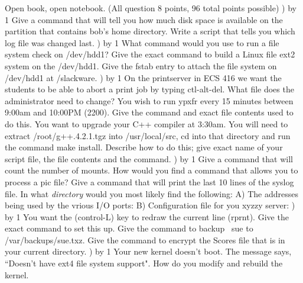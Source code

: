 
\parindent=0in
\nopagenumbers
\newcount\quesno
{}
\def\ques{\number\quesno) \advance\quesno by 1}
\def\aspace{\vskip 1.5in}

Open book, open notebook. (All question 8 points, 96 total points possible)
\hfill\break
\ques
Give a command that will tell you how much disk space is available on
the partition that contains bob's home directory.
\vskip 0.4in
Write a script that tells you which log file was changed last.
\vskip 1.1in
\ques
What command would you use to run a file system check on
{\ltt{}/dev/hdd1}?
\vskip 0.4in
Give the exact command to build a Linux file ext2 system on the
{\ltt{}/dev/hdd1}.
\vskip 0.4in
Give the {\ltt{}fstab} entry to attach the file system
on {\ltt{}/dev/hdd1} at {\ltt{}/slackware}.
\vskip 0.4in
\ques
On the printserver in ECS 416 we want the students to be able to
abort a print job by typing {\ltt{}ctl-alt-del}.
What file does the administrator need to change?
\vskip 0.4in
You wish to run {\ltt{}ypxfr} every 15 minutes between 9:00am and
10:00PM (2200).
Give the command and exact file contents used to do this.
\vskip 1.4in
You want to upgrade your {\ltt{}C++} compiler at 3:30am.
You will need to extract {\ltt{}/root/g++.4.2.1.tgz} into
{\ltt{}/usr/local/src}, {\ltt{}cd} into that directory and
run the command {\ltt{}make install}.
Describe how to do this; give exact name of your script file, the file contents
and the command.
\vskip 1.7in
\vfill\eject
\ques
Give a command that will count the number of mounts.
\vskip 0.4in
How would you find a command that allows you to process a {\ltt{}pic} file?
\vskip 0.4in
Give a command that will print the last 10 lines of the {\ltt{}syslog} file.
\vskip 0.4in
In what {\it directory} would you most likely find
the following:
\hfill\break
A) The addresses being used by the vrious I/O ports:
\vskip 0.3in
B) Configuration file for you {\ltt{}xyzzy} server:
\vskip 0.3in
\ques
You want the ({\ltt{}control-L}) key to redraw the current line ({\ltt{}rprnt}).
Give the exact command to set this up.
\vskip 0.4in
Give the command to backup {\ltt{}~sue} to {\ltt{}/var/backups/sue.txz}.
\vskip 1.0in
Give the command to encrypt the {\ltt{}Scores} file that is in your
current directory.
\vskip 1.0in
\ques
Your new kernel doesn't boot. The message says, ``Doesn't have ext4 file
system support".
How do you modify and rebuild the kernel.
